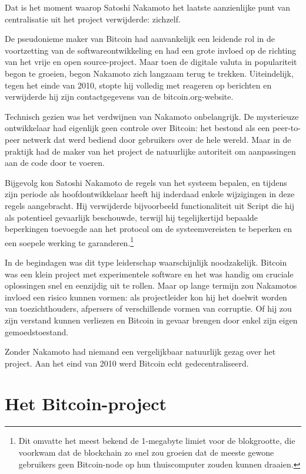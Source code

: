 \documentclass[
  a5paper,
  smalldemyvopaper,11pt,twoside,onecolumn,openright,extrafontsizes,
hidelinks]{memoir}
\begin{document}
Dat is het moment waarop Satoshi Nakamoto het laatste aanzienlijke punt
van centralisatie uit het project verwijderde: zichzelf.

De pseudonieme maker van Bitcoin had aanvankelijk een leidende rol in de
voortzetting van de softwareontwikkeling en had een grote invloed op de
richting van het vrije en open source-project. Maar toen de digitale
valuta in populariteit begon te groeien, begon Nakamoto zich langzaam
terug te trekken. Uiteindelijk, tegen het einde van 2010, stopte hij
volledig met reageren op berichten en verwijderde hij zijn
contactgegevens van de bitcoin.org-website.

Technisch gezien was het verdwijnen van Nakamoto onbelangrijk. De
mysterieuze ontwikkelaar had eigenlijk geen controle over Bitcoin: het
bestond als een peer-to-peer netwerk dat werd bediend door gebruikers
over de hele wereld. Maar in de praktijk had de maker van het project de
natuurlijke autoriteit om aanpassingen aan de code door te voeren.

Bijgevolg kon Satoshi Nakamoto de regels van het systeem bepalen, en
tijdens zijn periode als hoofdontwikkelaar heeft hij inderdaad enkele
wijzigingen in deze regels aangebracht. Hij verwijderde bijvoorbeeld
functionaliteit uit Script die hij als potentieel gevaarlijk beschouwde,
terwijl hij tegelijkertijd bepaalde beperkingen toevoegde aan het
protocol om de systeemvereisten te beperken en een soepele werking te
garanderen.\footnote{Dit omvatte het meest bekend de 1-megabyte limiet
  voor de blokgrootte, die voorkwam dat de blockchain zo snel zou
  groeien dat de meeste gewone gebruikers geen Bitcoin-node op hun
  thuiscomputer zouden kunnen draaien.}

In de begindagen was dit type leiderschap waarschijnlijk noodzakelijk.
Bitcoin was een klein project met experimentele software en het was
handig om cruciale oplossingen snel en eenzijdig uit te rollen. Maar op
lange termijn zou Nakamotos invloed een risico kunnen vormen: als
projectleider kon hij het doelwit worden van toezichthouders, afpersers
of verschillende vormen van corruptie. Of hij zou zijn verstand kunnen
verliezen en Bitcoin in gevaar brengen door enkel zijn eigen
gemoedstoestand.

Zonder Nakamoto had niemand een vergelijkbaar natuurlijk gezag over het
project. Aan het eind van 2010 werd Bitcoin echt gedecentraliseerd.

\section{Het Bitcoin-project}\label{het-bitcoin-project}
\end{document}
